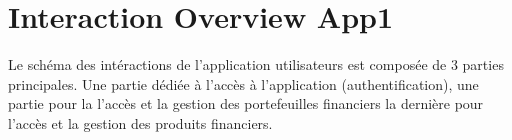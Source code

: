 \documentclass{article}
\begin{document}
\section{Interaction Overview App1}
Le schéma des intéractions de l'application utilisateurs est composée de 3 parties principales. Une partie dédiée à l'accès à l'application (authentification), une partie pour la l'accès et la gestion des portefeuilles financiers la dernière pour l'accès et la gestion des produits financiers.\\
\end{document}
